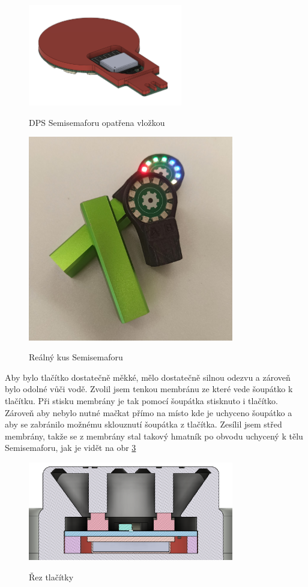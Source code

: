 \begin{figure}[!h]
  \centering
  \includegraphics[width=0.6\textwidth]{text/PraktickaCast/img/Semisemafor-vlozka.png}
  \label{Semisemafor-vlozka}
  \caption{DPS Semisemaforu opatřena vložkou}
\end{figure}

\begin{figure}[!h]
  \centering
  \includegraphics[width=0.8\textwidth]{text/PraktickaCast/img/Real-Semisemafor.jpg}
  \label{Semisemafor-real}
  \caption{Reálný kus Semisemaforu}
\end{figure}


Aby bylo tlačítko dostatečně měkké, mělo dostatečně silnou odezvu a zároveň bylo odolné vůči vodě.
Zvolil jsem tenkou membránu ze které vede šoupátko k tlačítku.
Při stisku membrány je tak pomocí šoupátka stisknuto i tlačítko.
Zároveň aby nebylo nutné mačkat přímo na místo kde je uchyceno šoupátko a aby se zabránilo možnému sklouznutí šoupátka z tlačítka.
Zesílil jsem střed membrány, takže se z membrány stal takový hmatník po obvodu uchycený k tělu Semisemaforu, jak je vidět na obr \ref{Semisemafor-rez-tlacitky}

\begin{figure}[!h]
  \centering
  \includegraphics[width=0.8\textwidth]{text/PraktickaCast/img/RezSemaforem.png}
  \label{Semisemafor-rez-tlacitky}
  \caption{Řez tlačítky}
\end{figure}